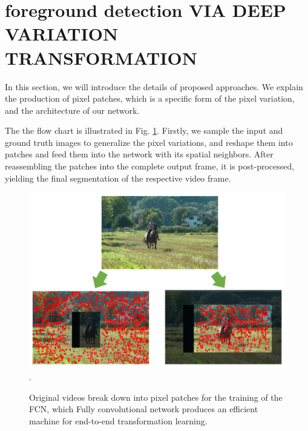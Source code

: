\documentclass[journal]{IEEEtran}
\newcommand{\reffig}[1]{Fig. \ref{#1}}
\DeclareMathOperator*{\argmin}{argmin}
\begin{document}



\section{foreground detection VIA DEEP VARIATION TRANSFORMATION}
\label{sec4}
In this section, we will introduce the details of proposed approaches. 
We explain the production of pixel patches, which is a specific form of the pixel variation, and the architecture of our network. 


The the flow chart is illustrated in \reffig{flow_chart}. 
Firstly, we sample the input and ground truth images to generalize the pixel variations, and reshape them into patches and feed them into the network with its spatial neighbors. 
After reassembling the patches into the complete output frame, it is post-processed, yielding the final segmentation of the respective video frame.
\begin{figure}[!t] %
\centering
\includegraphics[width=\textwidth]{figure/fig2}
\DeclareGraphicsExtensions.
    \caption{ Original videos break down into pixel patches for the training of the FCN, which 
Fully convolutional network produces an efficient machine for end-to-end transformation learning.}
    \label{flow_chart}
\end{figure}
\end{document}
